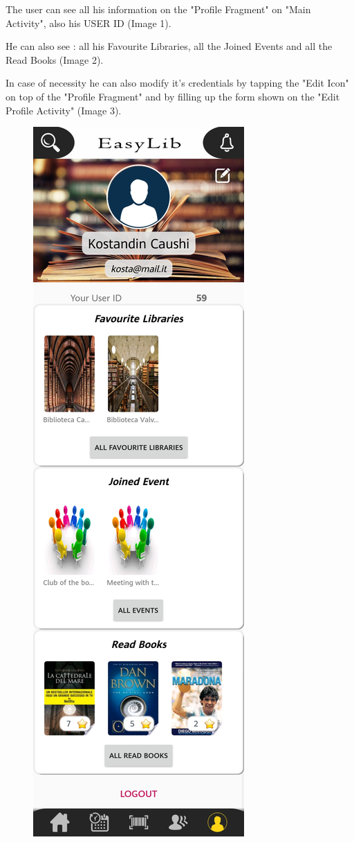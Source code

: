 \newpage
{}
The user can see all his information on the "Profile Fragment" on "Main Activity", also his USER ID (Image 1).\par
He can also see : all his Favourite Libraries, all the Joined Events and all the Read Books (Image 2).\par
In case of necessity he can also modify it's credentials by tapping the "Edit Icon" on top of the "Profile Fragment" and by filling up the form shown on the "Edit Profile Activity" (Image 3).
\vspace*{1cm}
\begin{figure}[H]
	\centering
	\includegraphics[scale=0.15]{Images/UI/Profile/1}

\end{figure}
